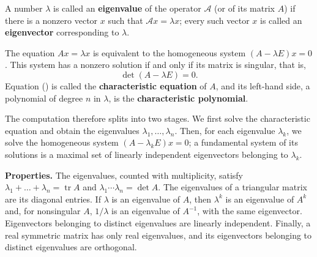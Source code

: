 
\begin{tarif}
A number $\lambda$ is called an \textbf{eigenvalue} of the operator
$\mathcal A$ (or of its matrix $A$) if there is a nonzero vector $x$ such
that $\mathcal Ax=\lambda x$; every such vector $x$ is called an
\textbf{eigenvector} corresponding to $\lambda$.
\end{tarif}

The equation $Ax=\lambda x$ is equivalent to the homogeneous system
$(A-\lambda E)x=0$. This system has a nonzero solution if and only if its
matrix is singular, that is,
\begin{equation}
\det(A-\lambda E)=0 .
\end{equation}
Equation (\theequation) is called the \textbf{characteristic equation}
of $A$, and its left-hand side, a polynomial of degree $n$ in $\lambda$,
is the \textbf{characteristic polynomial}.

The computation therefore splits into two stages. We first solve the
characteristic equation and obtain the eigenvalues
$\lambda_1,\dots,\lambda_n$. Then, for each eigenvalue $\lambda_k$, we
solve the homogeneous system $(A-\lambda_kE)x=0$; a fundamental system of
its solutions is a maximal set of linearly independent eigenvectors
belonging to $\lambda_k$.

\textbf{Properties.} The eigenvalues, counted with multiplicity, satisfy
$\lambda_1+\dots+\lambda_n=\operatorname{tr}A$ and
$\lambda_1\cdots\lambda_n=\det A$. The eigenvalues of a triangular matrix
are its diagonal entries. If $\lambda$ is an eigenvalue of $A$, then
$\lambda^k$ is an eigenvalue of $A^k$ and, for nonsingular $A$,
$1/\lambda$ is an eigenvalue of $A^{-1}$, with the same eigenvector.
Eigenvectors belonging to distinct eigenvalues are linearly independent.
Finally, a real symmetric matrix has only real eigenvalues, and its
eigenvectors belonging to distinct eigenvalues are orthogonal.


